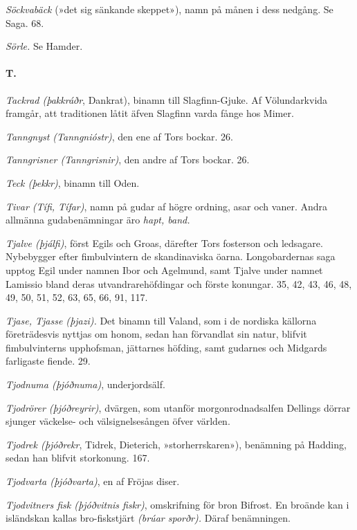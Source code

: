\protect\hypertarget{lb1625905.xhtmlux5cux23start241}{}{}\protect\hypertarget{lb1625905.xhtmlux5cux23start241-a}{}{}\protect\hypertarget{lb1625905.xhtmlux5cux23start241-b}{}{}\protect\hypertarget{lb1625905.xhtmlux5cux23start241-c}{}{}\protect\hypertarget{lb1625905.xhtmlux5cux23start241-d}{}{}

\emph{Söckvabäck} (»det sig sänkande skeppet»), namn på månen i dess
nedgång. Se Saga. 68.

\emph{Sörle.} Se Hamder.

\paragraph{T.}

\emph{Tackrad (þakkráðr}, Dankrat), binamn till Slagfinn-Gjuke. Af
Völundarkvida framgår, att traditionen låtit äfven Slagfinn varda fånge
hos Mimer.

\emph{Tanngnyst (Tanngnióstr)}, den ene af Tors bockar. 26.

\emph{Tanngrisner (Tanngrisnir)}, den andre af Tors bockar. 26.

\emph{Teck (þekkr)}, binamn till Oden.

\emph{Tivar (Tífi, Tífar)}, namn på gudar af högre ordning, asar och
vaner. Andra allmänna gudabenämningar äro \emph{hapt, band.}

\emph{Tjalve (þjálfi)}, först Egils och Groas, därefter Tors fosterson
och ledsagare. Nybebygger efter fimbulvintern de skandinaviska öarna.
Longobardernas saga upptog Egil under namnen Ibor och Agelmund, samt
Tjalve under namnet Lamissio bland deras utvandrarehöfdingar och förste
konungar. 35, 42, 43, 46, 48, 49, 50, 51, 52, 63, 65, 66, 91, 117.

\emph{Tjase, Tjasse (þjazi).} Det binamn till Valand, som i de nordiska
källorna företrädesvis nyttjas om honom, sedan han förvandlat sin natur,
blifvit fimbulvinterns upphofsman, jättarnes höfding, samt gudarnes och
Midgards farligaste fiende. 29.

\emph{Tjodnuma (þjóðnuma)}, underjordsälf.

\emph{Tjodrörer (þjóðreyrir)}, dvärgen, som utanför morgonrodnadsalfen
Dellings dörrar sjunger väckelse- och välsignelsesången öfver världen.

\emph{Tjodrek (þjóðrekr}, Tidrek, Dieterich, »storherrskaren»),
benämning på Hadding, sedan han blifvit storkonung. 167.

\emph{Tjodvarta (þjóðvarta)}, en af Fröjas diser.

\emph{Tjodvitners fisk (þjóðvitnis fiskr)}, omskrifning för bron
Bifrost. En broände kan i isländskan kallas bro-fiskstjärt \emph{(brúar
sporðr).} Däraf benämningen.

